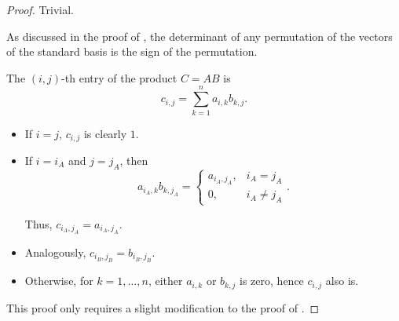 \begin{proof}
   Trivial.

   As discussed in the proof of , the determinant of any permutation of the vectors of the standard basis is the sign of the permutation.

   The \( (i, j) \)-th entry of the product \( C = AB \) is
  \begin{equation*}
    c_{i,j} = \sum_{k=1}^n a_{i,k} b_{k,j}.
  \end{equation*}

  \begin{itemize}
    \item If \( i = j \), \( c_{i,j} \) is clearly \( 1 \).
    \item If \( i = i_A \) and \( j = j_A \), then
    \begin{equation*}
      a_{i_A,k} b_{k,j_A} = \begin{cases}
        a_{i_A,j_A}, &i_A = j_A \\
        0,           &i_A \neq j_A
      \end{cases}.
    \end{equation*}

    Thus, \( c_{i_A,j_A} = a_{i_A,j_A} \).

    \item Analogously, \( c_{i_B,j_B} = b_{i_B,j_B} \).
    \item Otherwise, for \( k = 1, \ldots, n \), either \( a_{i,k} \) or \( b_{k,j} \) is zero, hence \( c_{i,j} \) also is.
  \end{itemize}

   This proof only requires a slight modification to the proof of .
\end{proof}

